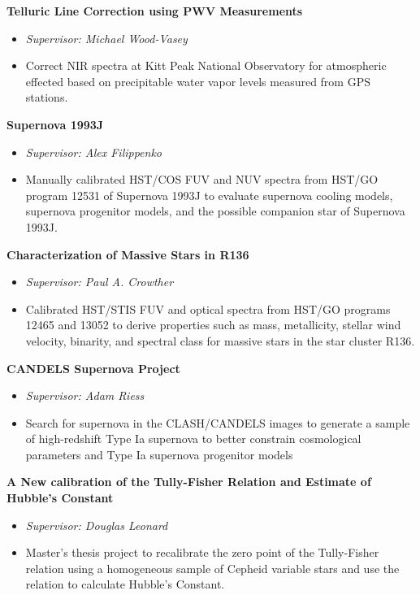 \documentclass{res}
\begin{document}
\begin{resume}
{\bf Telluric Line Correction using PWV Measurements}
    \begin{itemize}
    \item[] \emph{Supervisor: Michael Wood-Vasey}
    \item[] Correct NIR spectra at Kitt Peak National Observatory for atmospheric effected based on precipitable water vapor levels measured from GPS stations. 
    \end{itemize}

   {\bf  Supernova 1993J}
          \begin{itemize}
   	\item[] \emph{Supervisor: Alex Filippenko}
        \item[] Manually calibrated HST/COS FUV and NUV spectra from HST/GO program 12531 of Supernova 1993J to evaluate supernova cooling models, supernova progenitor models, and the possible companion star of Supernova 1993J. 
        \end{itemize} 
 
   {\bf  Characterization of Massive Stars in R136 } 
        \begin{itemize}
        \item[] \emph{Supervisor: Paul A. Crowther}
        \item[] Calibrated HST/STIS FUV and optical spectra from HST/GO programs 12465 and 13052 to derive properties such as mass, metallicity, stellar wind velocity, binarity, and spectral class for massive stars in the star cluster R136. 
        \end{itemize} 
        
	{\bf CANDELS Supernova Project}
		\begin{itemize}
		\item[] \emph{Supervisor: Adam Riess}
		\item[] Search for supernova in the CLASH/CANDELS images to generate a sample of high-redshift Type Ia supernova to better constrain cosmological parameters and Type Ia supernova progenitor models
		\end{itemize}

   {\bf  A New calibration of the Tully-Fisher Relation and Estimate of Hubble's Constant} 
           \begin{itemize}
   	\item[] \emph{Supervisor: Douglas Leonard}
        \item[] Master's thesis project to recalibrate the zero point of the Tully-Fisher relation using a homogeneous
        sample of Cepheid variable stars and use the relation to calculate Hubble's Constant. 
         \end{itemize} 
        

\end{resume}
\end{document}
